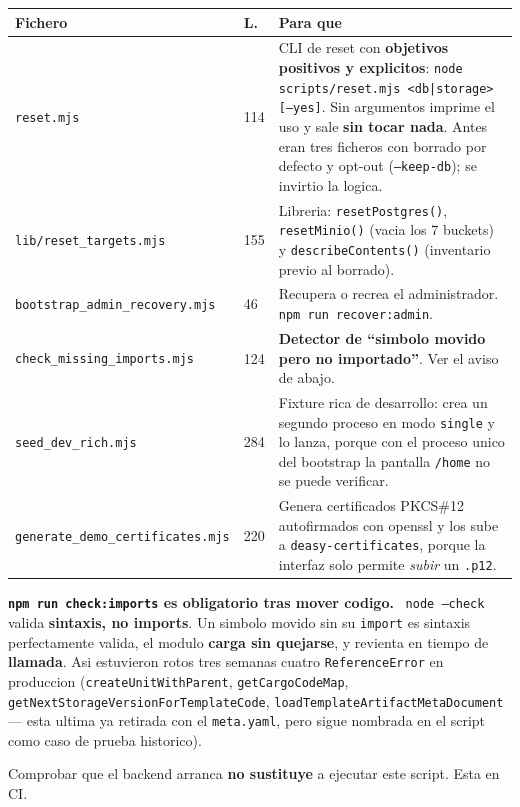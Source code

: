 \documentclass[11pt,a4paper,oneside]{report}
\newenvironment{aviso}[1][Aviso]{%
  \par\medskip
  \colorlet{shadecolor}{orange!14}%
  \begin{shaded}\noindent\textbf{\color{orange!45!black}#1.}\ \ignorespaces}%
  {\end{shaded}\par\medskip}
\newcommand{\rt}[1]{\texttt{#1}}
\begin{document}
\begin{center}
\footnotesize
\begin{tabularx}{\textwidth}{@{}P{5.0cm}P{0.9cm}L@{}}
\toprule
\textbf{Fichero} & \textbf{L.} & \textbf{Para que} \\
\midrule
\rt{reset.mjs} & 114 &
  CLI de reset con \textbf{objetivos positivos y explicitos}:
  \rt{node scripts/reset.mjs <db|storage> [--yes]}. Sin argumentos imprime el uso y sale
  \textbf{sin tocar nada}. Antes eran tres ficheros con borrado por defecto y opt-out
  (\rt{--keep-db}); se invirtio la logica. \\
\rt{lib/reset\_targets.mjs} & 155 &
  Libreria: \rt{resetPostgres()}, \rt{resetMinio()} (vacia los 7 buckets) y
  \rt{describeContents()} (inventario previo al borrado). \\
\rt{bootstrap\_admin\_recovery.mjs} & 46 &
  Recupera o recrea el administrador. \rt{npm run recover:admin}. \\
\rt{check\_missing\_imports.mjs} & 124 &
  \textbf{Detector de ``simbolo movido pero no importado''}. Ver el aviso de abajo. \\
\rt{seed\_dev\_rich.mjs} & 284 &
  Fixture rica de desarrollo: crea un segundo proceso en modo \rt{single} y lo lanza, porque
  con el proceso unico del bootstrap la pantalla \rt{/home} no se puede verificar. \\
\rt{generate\_demo\_certificates.mjs} & 220 &
  Genera certificados PKCS\#12 autofirmados con openssl y los sube a
  \rt{deasy-certificates}, porque la interfaz solo permite \emph{subir} un \rt{.p12}. \\
\bottomrule
\end{tabularx}
\end{center}

\begin{aviso}[\rt{npm run check:imports} es obligatorio tras mover codigo]
\rt{node --check} valida \textbf{sintaxis, no imports}. Un simbolo movido sin su \rt{import} es
sintaxis perfectamente valida, el modulo \textbf{carga sin quejarse}, y revienta en tiempo de
\textbf{llamada}. Asi estuvieron rotos tres semanas cuatro \rt{ReferenceError} en produccion
(\rt{createUnitWithParent}, \rt{getCargoCodeMap},
\rt{getNextStorageVersionForTemplateCode}, \rt{loadTemplateArtifactMetaDocument} --- esta
ultima ya retirada con el \rt{meta.yaml}, pero sigue nombrada en el script como caso de prueba
historico).

Comprobar que el backend arranca \textbf{no sustituye} a ejecutar este script. Esta en CI.
\end{aviso}
\end{document}
